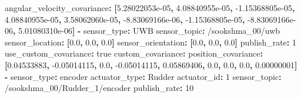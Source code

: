 \documentclass[
  letterpaper,
  DIV=11,
  numbers=noendperiod]{scrreprt}
\newenvironment{Shaded}{\begin{snugshade}}{\end{snugshade}}
\newcommand{\AttributeTok}[1]{\textcolor[rgb]{0.40,0.45,0.13}{#1}}
\newcommand{\CharTok}[1]{\textcolor[rgb]{0.13,0.47,0.30}{#1}}
\newcommand{\DecValTok}[1]{\textcolor[rgb]{0.68,0.00,0.00}{#1}}
\newcommand{\FloatTok}[1]{\textcolor[rgb]{0.68,0.00,0.00}{#1}}
\newcommand{\FunctionTok}[1]{\textcolor[rgb]{0.28,0.35,0.67}{#1}}
\newcommand{\KeywordTok}[1]{\textcolor[rgb]{0.00,0.23,0.31}{\textbf{#1}}}
\begin{document}
\begin{Shaded}
\begin{Highlighting}[]
\AttributeTok{      }\FunctionTok{angular\_velocity\_covariance}\KeywordTok{:}\AttributeTok{ }\KeywordTok{[}\FloatTok{5.28022053e{-}05}\KeywordTok{,}\AttributeTok{ }\FloatTok{4.08840955e{-}05}\KeywordTok{,}\AttributeTok{ }\FloatTok{{-}1.15368805e{-}05}\KeywordTok{,}\AttributeTok{ }\FloatTok{4.08840955e{-}05}\KeywordTok{,}\AttributeTok{ }\FloatTok{3.58062060e{-}05}\KeywordTok{,}\AttributeTok{ }\FloatTok{{-}8.83069166e{-}06}\KeywordTok{,}\AttributeTok{ }\FloatTok{{-}1.15368805e{-}05}\KeywordTok{,}\AttributeTok{ }\FloatTok{{-}8.83069166e{-}06}\KeywordTok{,}\AttributeTok{ }\FloatTok{5.01080310e{-}06}\KeywordTok{]}
\AttributeTok{  }
\AttributeTok{  }\KeywordTok{{-}}
\AttributeTok{    }\FunctionTok{sensor\_type}\KeywordTok{:}\AttributeTok{ UWB}
\AttributeTok{    }\FunctionTok{sensor\_topic}\KeywordTok{:}\AttributeTok{ /sookshma\_00/uwb}
\AttributeTok{    }\FunctionTok{sensor\_location}\KeywordTok{:}\AttributeTok{ }\KeywordTok{[}\FloatTok{0.0}\KeywordTok{,}\AttributeTok{ }\FloatTok{0.0}\KeywordTok{,}\AttributeTok{ }\FloatTok{0.0}\KeywordTok{]}
\AttributeTok{    }\FunctionTok{sensor\_orientation}\KeywordTok{:}\AttributeTok{ }\KeywordTok{[}\FloatTok{0.0}\KeywordTok{,}\AttributeTok{ }\FloatTok{0.0}\KeywordTok{,}\AttributeTok{ }\FloatTok{0.0}\KeywordTok{]}\AttributeTok{   }
\AttributeTok{    }\FunctionTok{publish\_rate}\KeywordTok{:}\AttributeTok{ }\DecValTok{1}
\AttributeTok{    }\FunctionTok{use\_custom\_covariance}\KeywordTok{:}\AttributeTok{ }\CharTok{true}
\AttributeTok{    }\FunctionTok{custom\_covariance}\KeywordTok{:}
\AttributeTok{      }\FunctionTok{position\_covariance}\KeywordTok{:}\AttributeTok{ }\KeywordTok{[}\FloatTok{0.04533883}\KeywordTok{,}\AttributeTok{ }\FloatTok{{-}0.05014115}\KeywordTok{,}\AttributeTok{ }\FloatTok{0.0}\KeywordTok{,}\AttributeTok{ }\FloatTok{{-}0.05014115}\KeywordTok{,}\AttributeTok{ }\FloatTok{0.05869406}\KeywordTok{,}\AttributeTok{ }\FloatTok{0.0}\KeywordTok{,}\AttributeTok{ }\FloatTok{0.0}\KeywordTok{,}\AttributeTok{ }\FloatTok{0.0}\KeywordTok{,}\AttributeTok{ }\FloatTok{0.00000001}\KeywordTok{]}
\AttributeTok{    }
\AttributeTok{  }\KeywordTok{{-}}
\AttributeTok{    }\FunctionTok{sensor\_type}\KeywordTok{:}\AttributeTok{ encoder}
\AttributeTok{    }\FunctionTok{actuator\_type}\KeywordTok{:}\AttributeTok{ Rudder}
\AttributeTok{    }\FunctionTok{actuator\_id}\KeywordTok{:}\AttributeTok{ }\DecValTok{1}
\AttributeTok{    }\FunctionTok{sensor\_topic}\KeywordTok{:}\AttributeTok{ /sookshma\_00/Rudder\_1/encoder}
\AttributeTok{    }\FunctionTok{publish\_rate}\KeywordTok{:}\AttributeTok{ }\DecValTok{10}
\end{Highlighting}
\end{Shaded}
\end{document}
